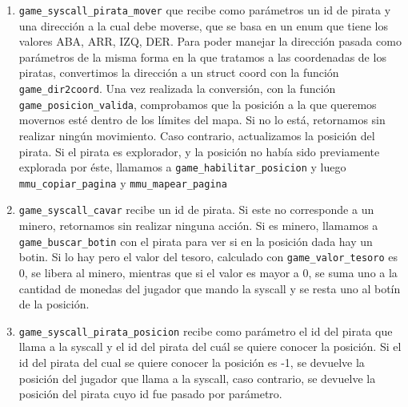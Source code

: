 \begin{enumerate}

	\item \texttt{game\_syscall\_pirata\_mover} que recibe como parámetros un id de pirata y una dirección a la cual debe moverse, que se basa en un enum que tiene los valores ABA, ARR, IZQ, DER.
	Para poder manejar la dirección pasada como parámetros de la misma forma en la que tratamos a las coordenadas de los piratas, convertimos la dirección a un struct coord con la función \texttt{game\_dir2coord}. Una vez realizada la conversión, con la función \texttt{game\_posicion\_valida}, comprobamos que la posición a la que queremos movernos esté dentro de los límites del mapa. Si no lo está, retornamos sin realizar ningún movimiento. Caso contrario, actualizamos la posición del pirata. Si el pirata es explorador, y la posición no había sido previamente explorada por éste, llamamos a \texttt{game\_habilitar\_posicion} y luego \texttt{mmu\_copiar\_pagina} y \texttt{mmu\_mapear\_pagina}

	\item \texttt{game\_syscall\_cavar} recibe un id de pirata. Si este no corresponde a un minero, retornamos sin realizar ninguna acción.
	Si es minero, llamamos a \texttt{game\_buscar\_botin} con el pirata para ver si en la posición dada hay un botin. Si lo hay pero el valor del tesoro, calculado con \texttt{game\_valor\_tesoro} es 0, se libera al minero, mientras que si el valor es mayor a 0, se suma uno a la cantidad de monedas del jugador que mando la syscall y se resta uno al botín de la posición.

	\item \texttt{game\_syscall\_pirata\_posicion} recibe como parámetro el id del pirata que llama a la syscall y el id del pirata del cuál se quiere conocer la posición. Si el id del pirata del cual se quiere conocer la posición es -1, se devuelve la posición del jugador que llama a la syscall, caso contrario, se devuelve la posición del pirata cuyo id fue pasado por parámetro.

\end{enumerate}
